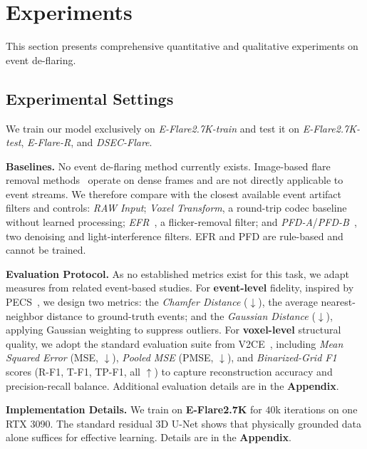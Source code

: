\section{Experiments}
\label{sec:experiments}
This section presents comprehensive quantitative and qualitative experiments on event de-flaring.

\subsection{Experimental Settings}

We train our model exclusively on \emph{E-Flare2.7K-train} and test it on \emph{E-Flare2.7K-test}, \emph{E-Flare-R}, and \emph{DSEC-Flare}.


\noindent\textbf{Baselines.}
No event de-flaring method currently exists. Image-based flare removal methods~\cite{wu2021train,dai2022flare7k,dai2024flare7k++,zhou2023improving} operate on dense frames and are not directly applicable to event streams. We therefore compare with the closest available event artifact filters and controls: \emph{RAW Input}; \emph{Voxel Transform}, a round-trip codec baseline without learned processing; \emph{EFR}~\cite{wang2022linear}, a flicker-removal filter; and \emph{PFD-A}/\emph{PFD-B}~\cite{shi2024polarity}, two denoising and light-interference filters. EFR and PFD are rule-based and cannot be trained.


\noindent\textbf{Evaluation Protocol.} 
As no established metrics exist for this task, we adapt measures from related event-based studies.  
For \textbf{event-level} fidelity, inspired by PECS~\cite{han2024physical}, we design two metrics: the \emph{Chamfer Distance} ($\downarrow$), the average nearest-neighbor distance to ground-truth events; and the \emph{Gaussian Distance} ($\downarrow$), applying Gaussian weighting to suppress outliers. For \textbf{voxel-level} structural quality, we adopt the standard evaluation suite from V2CE~\cite{zhang2023v2ce}, including \emph{Mean Squared Error} (MSE, $\downarrow$), \emph{Pooled MSE} (PMSE, $\downarrow$), and \emph{Binarized-Grid F1} scores (R-F1, T-F1, TP-F1, all $\uparrow$) to capture reconstruction accuracy and precision-recall balance. Additional evaluation details are in the \textbf{Appendix}.


\noindent\textbf{Implementation Details.} 
We train on \textbf{E-Flare2.7K} for $40$k iterations on one RTX 3090. The standard residual 3D U-Net shows that physically grounded data alone suffices for effective learning. Details are in the \textbf{Appendix}.



